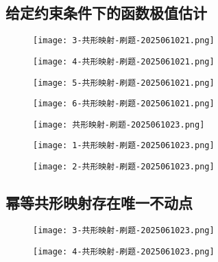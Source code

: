 \subsection{给定约束条件下的函数极值估计}

\begin{exercise}
\begin{figure}[H]
\centering
\texttt{[image: 3-共形映射-刷题-2025061021.png]}
\label{}
\end{figure}
\end{exercise}
\begin{figure}[H]
\centering
\texttt{[image: 4-共形映射-刷题-2025061021.png]}
\label{}
\end{figure}

\begin{exercise}
\begin{figure}[H]
\centering
\texttt{[image: 5-共形映射-刷题-2025061021.png]}
\label{}
\end{figure}
\end{exercise}
\begin{figure}[H]
\centering
\texttt{[image: 6-共形映射-刷题-2025061021.png]}
\label{}
\end{figure}

\begin{exercise}
\begin{figure}[H]
\centering
\texttt{[image: 共形映射-刷题-2025061023.png]}
\label{}
\end{figure}
\end{exercise}
\begin{figure}[H]
\centering
\texttt{[image: 1-共形映射-刷题-2025061023.png]}
\label{}
\end{figure}
\begin{figure}[H]
\centering
\texttt{[image: 2-共形映射-刷题-2025061023.png]}
\label{}
\end{figure}

\subsection{幂等共形映射存在唯一不动点}

\begin{exercise}
\begin{figure}[H]
\centering
\texttt{[image: 3-共形映射-刷题-2025061023.png]}
\label{}
\end{figure}
\end{exercise}
\begin{figure}[H]
\centering
\texttt{[image: 4-共形映射-刷题-2025061023.png]}
\label{}
\end{figure}


